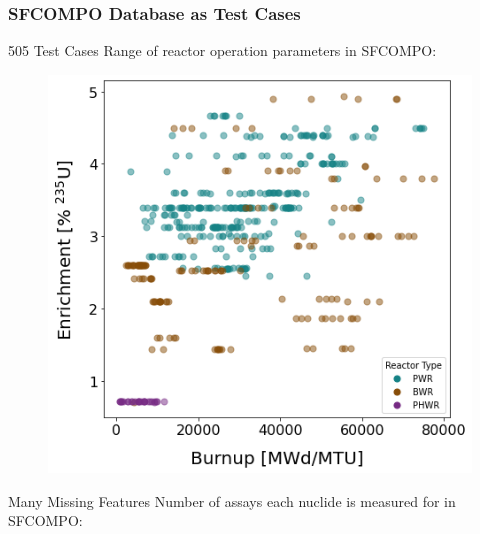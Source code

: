\begin{frame}
  \frametitle{SFCOMPO Database as Test Cases}
  \begin{adjustwidth}{-10pt}{-10pt}
  \vspace{-8pt}
  \begin{minipage}[t]{0.45\textwidth}
    \begin{block}{505 Test Cases}
      Range of reactor operation parameters in SFCOMPO:
      \begin{figure}
        \centering
        \includegraphics[width=\textwidth]{./figures/sfcompo_scatter_viz.png}
      \end{figure}
    \end{block}
  \end{minipage}%
  \hfill
  \begin{minipage}[t]{0.57\textwidth}
    \begin{block}{Many Missing Features}
      Number of assays each nuclide is measured for in SFCOMPO:
      \begin{table}
        \footnotesize
        \centering
        \renewcommand{\arraystretch}{1.3}
        \begin{tabular}{>{\raggedleft}m{0.32in}
                                      m{0.16in}|
                        >{\raggedleft}m{0.32in}
                                      m{0.16in}|
                        >{\raggedleft}m{0.32in}
                                      m{0.16in}}

\end{tabular}
\end{table}
\end{block}
\end{minipage}
\end{adjustwidth}
\end{frame}
